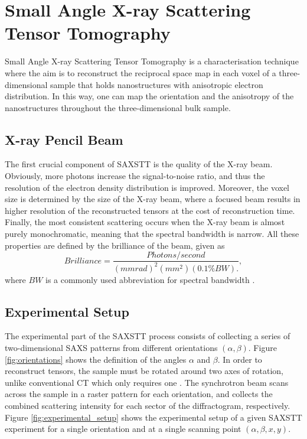 \chapter{Small Angle X-ray Scattering Tensor Tomography}
\label{chap:SAXSTT}

Small Angle X-ray Scattering Tensor Tomography is a characterisation technique where the aim is to reconstruct the reciprocal space map in each voxel of a three-dimensional sample
that holds nanostructures with anisotropic electron distribution.
In this way, one can map the orientation and the anisotropy of the nanostructures throughout the three-dimensional bulk sample.

\section{X-ray Pencil Beam} %
The first crucial component of SAXSTT is the quality of the X-ray beam.
Obviously, more photons increase the signal-to-noise ratio, and thus the resolution of the electron density distribution is improved.
Moreover, the voxel size is determined by the size of the X-ray beam, where a focused beam results in higher resolution of the reconstructed tensors at the cost of reconstruction time.
Finally, the most consistent scattering occurs when the X-ray beam is almost purely monochromatic, meaning that the spectral bandwidth is narrow.
All these properties are defined by the brilliance of the beam, given as
\begin{equation}\label{eq:brilliance}
    Brilliance = \frac{Photons/second}{\left( mmrad \right)^{2} \left( mm^{2} \right) \left( 0.1\% BW \right).},
\end{equation}
where $BW$ is a commonly used abbreviation for spectral bandwidth \cite{mcmorrow2011elements}.

\section{Experimental Setup}
The experimental part of the SAXSTT process consists of collecting a series of two-dimensional SAXS patterns from different orientations $\left(\alpha,\beta\right)$.
Figure \ref{fig:orientations} shows the definition of the angles $\alpha$ and $\beta$. %
In order to reconstruct tensors, the sample must be rotated around two axes of rotation, unlike conventional CT which only requires one \cite{liebi2018small}.
The synchrotron beam scans across the sample in a raster pattern for each orientation, and collects the combined scattering intensity for each sector of the diffractogram, respectively.
Figure \ref{fig:experimental_setup} shows the experimental setup of a given SAXSTT experiment for a single orientation and at a single scanning point $(\alpha, \beta,x,y)$.

